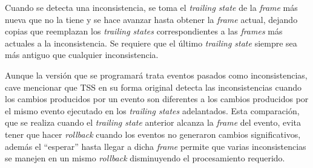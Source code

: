 Cuando se detecta una inconsistencia, se toma el \emph{trailing state} de la \emph{frame} más nueva que no la tiene y se hace avanzar hasta obtener la \emph{frame} actual, dejando copias que reemplazan los \emph{trailing states} correspondientes a las \emph{frames} más actuales a la inconsistencia. Se requiere que el último \emph{trailing state} siempre sea más antiguo que cualquier inconsistencia.

Aunque la versión que se programará trata eventos pasados como inconsistencias, cave mencionar que TSS en su forma original detecta las inconsistencias cuando los cambios producidos por un evento son diferentes a los cambios producidos por el mismo evento ejecutado en los \emph{trailing states} adelantados. Esta comparación, que se realiza cuando el \emph{trailing state} anterior alcanza la \emph{frame} del evento, evita tener que hacer \emph{rollback} cuando los eventos no generaron cambios significativos, además el ``esperar'' hasta llegar a dicha \emph{frame} permite que varias inconsistencias se manejen en un mismo \emph{rollback} disminuyendo el procesamiento requerido.



